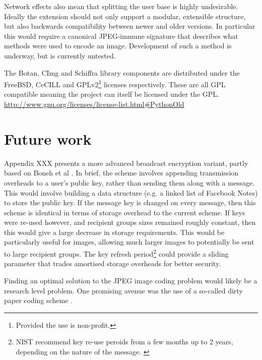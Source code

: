 Network effects also mean that splitting the user base is highly undesirable. Ideally the extension should not only support a modular, extensible structure, but also backwards compatibility between newer and older versions. In particular this would require a canonical JPEG-immune signature that describes what methods were used to encode an image. Development of such a method is underway, but is currently untested.

The Botan, CImg and Schiffra library components are distributed under the FreeBSD, CeCILL and GPLv2\footnote{Provided the use is non-profit.} licenses respectively. These are all GPL compatible meaning the project can itself be licensed under the GPL. \url{http://www.gnu.org/licenses/license-list.html#PythonOld}


\section{Future work}
\label{sec:future}

Appendix XXX presents a more advanced broadcast encryption variant, partly based on Boneh et al \cite{boneh}. In brief, the scheme involves appending transmission overheads to a user's public key, rather than sending them along with a message. This would involve building a data structure (e.g. a linked list of Facebook Notes) to store the public key. If the message key is changed on every message, then this scheme is identical in terms of storage overhead to the current scheme. If keys were re-used however, and recipient groups sizes remained roughly constant, then this would give a large decrease in storage requirements. This would be particularly useful for images, allowing much larger images to potentially be sent to large recipient groups. The key refresh period\footnote{NIST recommend key re-use peroids from a few months up to 2 years, depending on the nature of the message. \cite{nist-keys}} could provide a sliding parameter that trades amortised storage overheads for better security.

Finding an optimal solution to the JPEG image coding problem would likely be a research level problem. One promising avenue was the use of a so-called dirty paper coding scheme \cite{XXX}.







